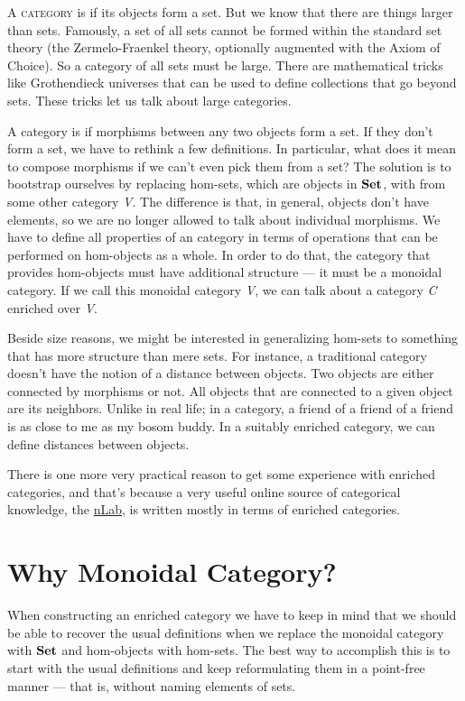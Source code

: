 \lettrine[lhang=0.17]{A}{ category} is  if its objects form a set. But we know that
there are things larger than sets. Famously, a set of all sets cannot be
formed within the standard set theory (the Zermelo-Fraenkel theory,
optionally augmented with the Axiom of Choice). So a category of all
sets must be large. There are mathematical tricks like Grothendieck
universes that can be used to define collections that go beyond sets.
These tricks let us talk about large categories.

A category is  if morphisms between any two objects
form a set. If they don't form a set, we have to rethink a few
definitions. In particular, what does it mean to compose morphisms if we
can't even pick them from a set? The solution is to bootstrap ourselves
by replacing hom-sets, which are objects in $\mathbf{Set}$, with
 from some other category \emph{V}. The difference is
that, in general, objects don't have elements, so we are no longer
allowed to talk about individual morphisms. We have to define all
properties of an  category in terms of operations that
can be performed on hom-objects as a whole. In order to do that, the
category that provides hom-objects must have additional structure --- it
must be a monoidal category. If we call this monoidal category \emph{V},
we can talk about a category \emph{C} enriched over \emph{V}.

Beside size reasons, we might be interested in generalizing hom-sets to
something that has more structure than mere sets. For instance, a
traditional category doesn't have the notion of a distance between
objects. Two objects are either connected by morphisms or not. All
objects that are connected to a given object are its neighbors. Unlike
in real life; in a category, a friend of a friend of a friend is as
close to me as my bosom buddy. In a suitably enriched category, we can
define distances between objects.

There is one more very practical reason to get some experience with
enriched categories, and that's because a very useful online source of
categorical knowledge, the \href{https://ncatlab.org/}{nLab}, is written
mostly in terms of enriched categories.

\section{Why Monoidal Category?}\label{why-monoidal-category}

When constructing an enriched category we have to keep in mind that we
should be able to recover the usual definitions when we replace the
monoidal category with $\mathbf{Set}$ and hom-objects with hom-sets. The
best way to accomplish this is to start with the usual definitions and
keep reformulating them in a point-free manner --- that is, without
naming elements of sets.

